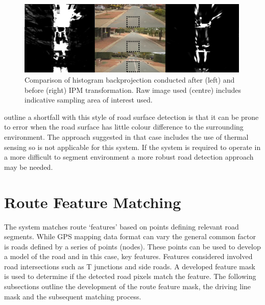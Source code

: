\documentclass[]{aiaa-tc}%
\begin{document}
\begin{figure}
	\includegraphics[width=0.99\textwidth]{RoadDetection/histIPMcompare.png}
	\caption{Comparison of histogram backprojection conducted after (left) and before (right) IPM transformation. Raw image used (centre) includes indicative sampling area of interest used.}
	\label{f:histIPMcompare}
\end{figure}





\citet{histBackRefineShadows} outline a shortfall with this style of road surface detection is that it can be prone to error when the road surface has little colour difference to the surrounding environment. The approach suggested in that case includes the use of thermal sensing so is not applicable for this system. If the system is required to operate in a more difficult to segment environment a more robust road detection approach may be needed. 


\section{Route Feature Matching}\label{sect:route_feature_matching}

The system matches route `features' based on points defining relevant road segments. While GPS mapping data format can vary the general common factor is roads defined by a series of points (nodes). These points can be used to develop a model of the road and in this case, key features. Features considered involved road intersections such as T junctions and side roads. A developed feature mask is used to determine if the detected road pixels match the feature. The following subsections outline the development of the route feature mask, the driving line mask and the subsequent matching process.
\end{document}
